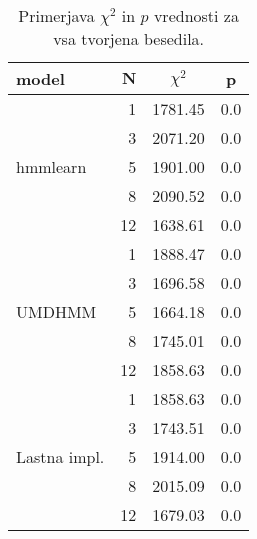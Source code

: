 \begin{table}
\centering
\begin{tabular}{l r cc}
\toprule
{\bf model}  & $\mathbf{N}$ & {\bf $\chi^2$} & \bf{p} \\
  \midrule\multirow{5}{*}{hmmlearn} %
    &  1              & 1781.45        & 0.0 \\
    &  3              & 2071.20        & 0.0 \\
    &  5              & 1901.00        & 0.0 \\
    &  8              & 2090.52        & 0.0 \\
    & 12              & 1638.61        & 0.0 \\
  \midrule\multirow{5}{*}{UMDHMM} %
    &  1              & 1888.47        & 0.0 \\
    &  3              & 1696.58        & 0.0 \\
    &  5              & 1664.18        & 0.0 \\
    &  8              & 1745.01        & 0.0 \\
    & 12              & 1858.63        & 0.0 \\
  \midrule\multirow{5}{*}{Lastna impl.} %
    &  1              & 1858.63        & 0.0 \\
    &  3              & 1743.51        & 0.0 \\
    &  5              & 1914.00        & 0.0 \\
    &  8              & 2015.09        & 0.0 \\
    & 12              & 1679.03        & 0.0 \\
\bottomrule
\end{tabular} \\
\vspace{6pt}{\centering N \dots št. skritih stanj modela}
\caption{Primerjava $\chi^2$ in $p$ vrednosti za vsa tvorjena besedila.}
\label{tab:bench:models_vs_corpus}
\end{table}
